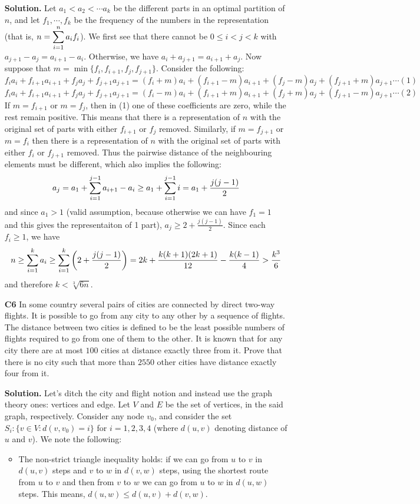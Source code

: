 \documentclass[11pt,a4paper]{article}
\begin{document}
\begin{enumerate}
	\textbf{Solution.} Let $a_1<a_2<\cdots a_k$ be the different parts in an optimal partition of $n$, and let $f_1, \cdots , f_k$ be the frequency of the numbers in the representation 
	(that is, $n=\displaystyle\sum_{i=1}^n a_if_i$). 
	We first see that there cannot be $0\le i< j < k$ with $a_{j+1}-a_j=a_{i+1}-a_i$. 
	Otherwise, we have $a_i+a_{j+1}=a_{i+1}+a_j$. 
	Now suppose that $m = \min\{f_i, f_{i+1}, f_j, f_{j+1}\}$. Consider the following:
	\[f_ia_i+f_{i+1}a_{i+1}+f_ja_j+f_{j+1}a_{j+1}
	=(f_i+m)a_i+(f_{i+1}-m)a_{i+1}+(f_j-m)a_j+(f_{j+1}+m)a_{j+1}\cdots (1)
	\]
	\[f_ia_i+f_{i+1}a_{i+1}+f_ja_j+f_{j+1}a_{j+1}
	=(f_i-m)a_i+(f_{i+1}+m)a_{i+1}+(f_j+m)a_j+(f_{j+1}-m)a_{j+1}\cdots (2)
	\]
	If $m=f_{i+1}$ or $m=f_j$, then in (1) one of these coefficients are zero, while the rest remain positive. This means that there is a representation of $n$ with the original set of parts with either $f_{i+1}$ or $f_j$ removed. 
	Similarly, if $m=f_{j+1}$ or $m=f_i$ then there is a representation of $n$ with the original set of parts with either $f_i$ or $f_{j+1}$ removed. 
	Thus the pairwise distance of the neighbouring elements must be different, which also implies the following: 
	\[a_j=a_1+\displaystyle\sum_{i=1}^{j-1}a_{i+1}-a_i\ge a_1+\displaystyle\sum_{i=1}^{j-1}i=a_1+\frac{j(j-1)}{2}
	\]
	and since $a_1>1$ (valid assumption, because otherwise we can have $f_1=1$ and this gives the representaiton of 1 part), $a_j\ge 2+\frac{j(j-1)}{2}$. Since each $f_i\ge 1$, we have 
	\[
	n\ge \displaystyle\sum_{i=1}^k a_i
	\ge \displaystyle\sum_{i=1}^k \left(2 + \frac{j(j-1)}{2}\right)
	=2k+\frac{k(k+1)(2k+1)}{12}-\frac{k(k-1)}{4}
	>\frac{k^3}{6}
	\]
	and therefore $k<\sqrt[3]{6n}$. 
	
	\item[\textbf{C6}] In some country several pairs of cities are connected by direct two-way flights. It is possible to go from any city to any other by a sequence of flights. The distance between two cities is defined to be the least possible numbers of flights required to go from one of them to the other. It is known that for any city there are at most $100$ cities at distance exactly three from it. Prove that there is no city such that more than $2550$ other cities have distance exactly four from it.
	
	\textbf{Solution.} Let's ditch the city and flight notion and instead use the graph theory ones: vertices and edge. Let $V$ and $E$ be the set of vertices, in the said graph, respectively. Consider any node $v_0$, and consider the set $S_i: \{v\in V: d(v, v_0)=i\}$ for $i=1, 2, 3, 4$ (where $d(u, v)$ denoting distance of $u$ and $v$). We note the following: 
	\begin{itemize}
		\item The non-strict triangle inequality holds: if we can go from $u$ to $v$ in $d(u, v)$ steps and $v$ to $w$ in $d(v, w)$ steps, using the shortest route from $u$ to $v$ and then from $v$ to $w$ we can go from $u$ to $w$ in $d(u, w)$ steps. This means, $d(u, w)\le d(u, v)+d(v, w)$. 
		

\end{itemize}
\end{enumerate}
\end{document}
